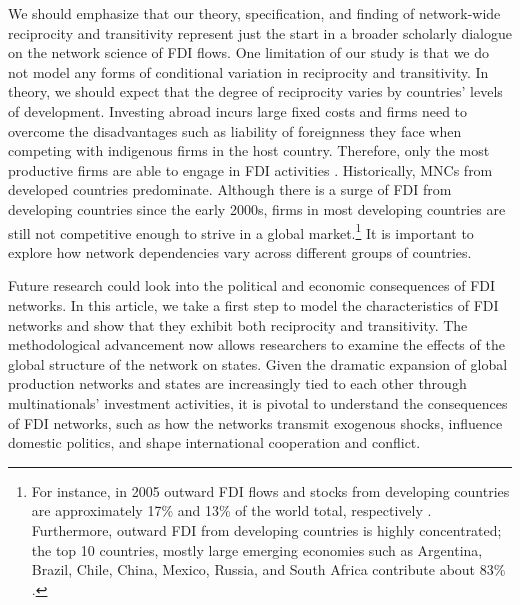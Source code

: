 \documentclass[reqno,onecolumn,letterpaper,12pt]{article}
\begin{document}


We should emphasize that our theory, specification, and finding of network-wide reciprocity and transitivity represent just the start in a broader scholarly dialogue on the network science of FDI flows. One limitation of our study is that we do not model any forms of conditional variation in reciprocity and transitivity. In theory, we should expect that the degree of reciprocity varies by countries' levels of development. Investing abroad incurs large fixed costs and firms need to overcome the disadvantages such as liability of foreignness they face when competing with indigenous firms in the host country. Therefore, only the most productive firms are able to engage in FDI activities \citep{Melitz:2003,Helpman_et_al:2004}. Historically, MNCs from developed countries predominate. Although there is a surge of FDI from developing countries since the early 2000s, firms in most developing countries are still not competitive enough to strive in a global market.\footnote{For instance, in 2005 outward FDI flows and stocks from developing countries are approximately 17\% and 13\% of the world total, respectively \citep{UNCTAD:2006}. Furthermore, outward FDI from developing countries is highly concentrated; the top 10 countries, mostly large emerging economies such as Argentina, Brazil, Chile, China, Mexico, Russia, and South Africa contribute about 83\% \citep{UNCTAD:2006}. } It is important to explore how network dependencies vary across different groups of countries.

Future research could look into the political and economic consequences of FDI networks. In this article, we take a first step to model the characteristics of FDI networks and show that they exhibit both reciprocity and transitivity. The methodological advancement now allows researchers to examine the effects of the global structure of the network on states. Given the dramatic expansion of global production networks and states are increasingly tied to each other through multinationals' investment activities, it is pivotal to understand the consequences of FDI networks, such as how the networks transmit exogenous shocks, influence domestic politics, and shape international cooperation and conflict.




\newpage
\singlespacing


\end{document}
